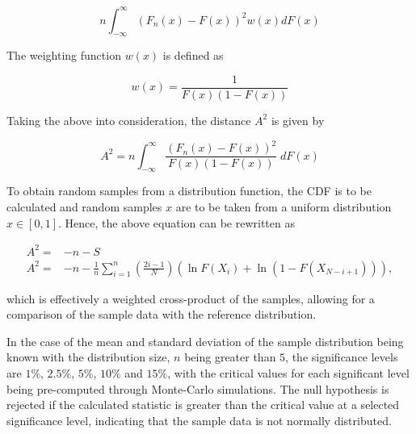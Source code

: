\documentclass[12pt]{article}
\begin{document}
\begin{equation}
  n \int_{-\infty}^{\infty} \left( F_n(x) - F(x) \right)^2 w(x) dF(x)
  \label{eq:ad_distance_function}
\end{equation}

\medskip
\noindent The weighting function $w(x)$ is defined as

\begin{equation}
    w(x) = \frac{1}{F(x) (1 - F(x))}
    \label{eq:ad_weighting_function}
\end{equation}

\medskip
\noindent Taking the above into consideration, the distance $A^2$ \cite{anderson1954test} is given by

\begin{equation}
    A^2 = n \int_{-\infty}^{\infty} \frac{\left( F_n(x) - F(x) \right)^2}{F(x)(1 - F(x))} \; dF(x)
    \label{eq:ad_statistic_distance_updated}
\end{equation}

\medskip
\noindent To obtain random samples from a distribution function, the CDF is to be calculated and random samples $x$ are to be taken from a uniform distribution $x \in [0, 1]$. Hence, the above equation can be rewritten as

\begin{align}
    A^2 =& -n -S \\
    A^2 =& -n - \frac{1}{n} \sum\limits_{i=1}^{n} \left( \frac{2i - 1}{N} \right) \left( \ln F(X_i) + \ln (1 - F(X_{N-i+1})) \right),
    \label{eq:ad_statistic}
\end{align}

\noindent which is effectively a weighted cross-product of the samples, allowing for a comparison of the sample data with the reference distribution.

\medskip
\noindent In the case of the mean and standard deviation of  the sample distribution being known with the distribution size, $n$ being greater than $5$, the significance levels are $1\%$, $2.5\%$, $5\%$, $10\%$ and $15\%$, with the critical values for each significant level being pre-computed through Monte-Carlo simulations. The null hypothesis is rejected if the calculated statistic is greater than the critical value at a selected significance level, indicating that the sample data is not normally distributed.
\end{document}
